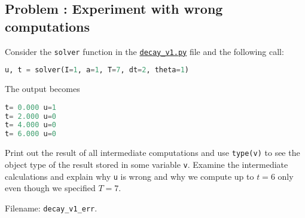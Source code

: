 \documentclass[graybox,sectrefs,envcountresetchap,open=right,final]{svmonodo}
\newenvironment{doconceexercise}{}{}
\newcounter{doconceexercisecounter}
\begin{document}
\begin{doconceexercise}

\subsection*{Problem \thedoconceexercisecounter: Experiment with wrong computations}

\label{decay:exer:decay1err}

Consider the \texttt{solver} function in the \href{{http://tinyurl.com/ofkw6kc/alg/decay_v1.py}}{\nolinkurl{decay_v1.py}} file
and the following call:

\begin{lstlisting}[language=Python,style=blue1_bluegreen]
u, t = solver(I=1, a=1, T=7, dt=2, theta=1)
\end{lstlisting}
The output becomes

\begin{lstlisting}[language=Python,style=gray]
t= 0.000 u=1
t= 2.000 u=0
t= 4.000 u=0
t= 6.000 u=0
\end{lstlisting}
Print out the result of all intermediate computations and use
\texttt{type(v)} to see the object type of the result stored in some variable \texttt{v}.
Examine the intermediate calculations and explain
why \texttt{u} is wrong and why we compute up to $t=6$ only even though we
specified $T=7$.


\noindent Filename: \Verb!decay_v1_err!.

\end{doconceexercise}
\end{document}
